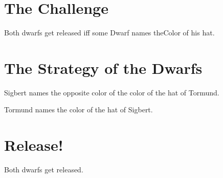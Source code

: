 \documentclass{article}
\begin{document}
\section{The Challenge}

\begin{forthel}

\begin{definition} Both dwarfs get released iff some Dwarf names theColor
of his hat.
\end{definition}

\end{forthel}

\section{The Strategy of the Dwarfs}

\begin{forthel}
\begin{axiom}
Sigbert names the opposite color of the color of the hat of Tormund.
\end{axiom}

\begin{axiom}
Tormund names the color of the hat of Sigbert.
\end{axiom}

\end{forthel}

\section{Release!}

\begin{forthel}

\begin{theorem}
Both dwarfs get released.
\end{theorem}

\end{forthel}
\end{document}
